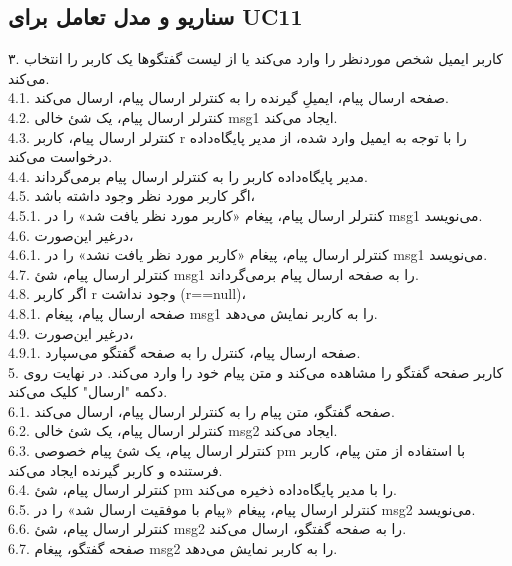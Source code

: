 \documentclass[12pt]{article}
\begin{document}
	\newpage
	\subsection{سناریو و مدل تعامل برای UC11}
	۳. کاربر ایمیل شخص مورد‌نظر را وارد می‌کند یا از لیست گفتگوها یک کاربر را انتخاب می‌کند.\\
	4.1.  صفحه ارسال پیام، ایمیلِ گیرنده را به کنترلر ارسال پیام، ارسال می‌کند.\\
	4.2.  کنترلر ارسال پیام، یک شئ خالی msg1 ایجاد می‌کند.\\
	4.3.  کنترلر ارسال پیام، کاربر r را با توجه به ایمیل وارد شده، از مدیر پایگاه‌داده درخواست می‌کند.\\
	4.4.  مدیر پایگاه‌داده کاربر را به کنترلر ارسال پیام برمی‌گرداند.\\
	4.5.  اگر کاربر مورد نظر وجود داشته باشد،\\
	4.5.1.   کنترلر ارسال پیام، پیغام «کاربر مورد نظر یافت شد» را در msg1 می‌نویسد.\\
	4.6.  در‌غیر این‌صورت،\\
	4.6.1.   کنترلر ارسال پیام، پیغام «کاربر مورد نظر یافت نشد» را در msg1 می‌نویسد.\\
	4.7.  کنترلر ارسال پیام، شئ msg1 را به صفحه ارسال پیام برمی‌گرداند.\\
	4.8.  اگر کاربر r وجود نداشت (r==null)،\\
	4.8.1.   صفحه ارسال پیام، پیغام msg1 را به کاربر نمایش می‌دهد.\\
	4.9.  درغیر این‌صورت،\\
	4.9.1.   صفحه ارسال پیام، کنترل را به صفحه گفتگو می‌سپارد.\\
	5. کاربر صفحه گفتگو را مشاهده می‌کند و متن پیام خود را وارد می‌کند. در نهایت روی دکمه "ارسال" کلیک می‌کند.\\
	6.1.  صفحه گفتگو، متن پیام را به کنترلر ارسال پیام، ارسال می‌کند.\\
	6.2.  کنترلر ارسال پیام، یک شئ خالی msg2 ایجاد می‌کند.\\
	6.3.  کنترلر ارسال پیام، یک شئ پیام خصوصی pm با استفاده از متن پیام، کاربر فرستنده و کاربر گیرنده ایجاد می‌کند.\\
	6.4.  کنترلر ارسال پیام، شئ pm را با مدیر پایگاه‌داده ذخیره می‌کند.\\
	6.5.  کنترلر ارسال پیام، پیغام «پیام با موفقیت ارسال شد» را در msg2 می‌نویسد.\\
	6.6.  کنترلر ارسال پیام، شئ msg2 را به صفحه گفتگو، ارسال می‌کند.\\
	6.7.  صفحه گفتگو، پیغام msg2 را به کاربر نمایش می‌دهد.\\
\end{document}
